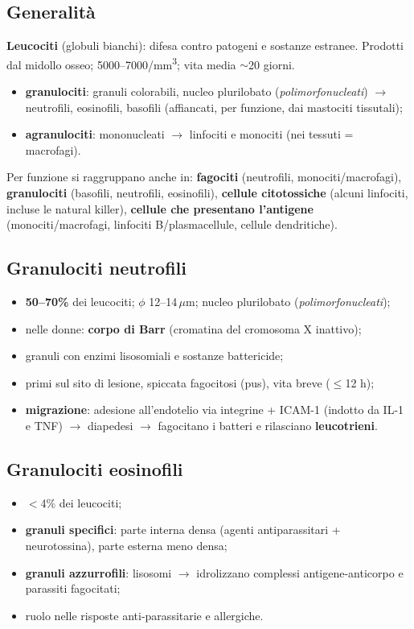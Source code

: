 \subsection{Generalità}
\textbf{Leucociti} (globuli bianchi): difesa contro patogeni e sostanze estranee. Prodotti dal
midollo osseo; 5000--7000/mm\textsuperscript{3}; vita media $\sim$20 giorni.
\begin{itemize}
  \item \textbf{granulociti}: granuli colorabili, nucleo plurilobato (\textit{polimorfonucleati})
    $\rightarrow$ neutrofili, eosinofili, basofili (affiancati, per funzione, dai mastociti
    tissutali);
  \item \textbf{agranulociti}: mononucleati $\rightarrow$ linfociti e monociti (nei tessuti =
    macrofagi).
\end{itemize}
Per funzione si raggruppano anche in: \textbf{fagociti} (neutrofili, monociti/macrofagi),
\textbf{granulociti} (basofili, neutrofili, eosinofili), \textbf{cellule citotossiche} (alcuni
linfociti, incluse le natural killer), \textbf{cellule che presentano l'antigene}
(monociti/macrofagi, linfociti B/plasmacellule, cellule dendritiche).

\subsection{Granulociti neutrofili}
\begin{itemize}
  \item \textbf{50--70\%} dei leucociti; $\phi$ 12--14\,$\mu$m; nucleo plurilobato
    (\textit{polimorfonucleati});
  \item nelle donne: \textbf{corpo di Barr} (cromatina del cromosoma X inattivo);
  \item granuli con enzimi lisosomiali e sostanze battericide;
  \item primi sul sito di lesione, spiccata fagocitosi (pus), vita breve ($\le$12 h);
  \item \textbf{migrazione}: adesione all'endotelio via integrine + ICAM-1 (indotto da IL-1 e TNF)
    $\rightarrow$ diapedesi $\rightarrow$ fagocitano i batteri e rilasciano \textbf{leucotrieni}.
\end{itemize}

\subsection{Granulociti eosinofili}
\begin{itemize}
  \item $<$4\% dei leucociti;
  \item \textbf{granuli specifici}: parte interna densa (agenti antiparassitari + neurotossina),
    parte esterna meno densa;
  \item \textbf{granuli azzurrofili}: lisosomi $\rightarrow$ idrolizzano complessi antigene-anticorpo
    e parassiti fagocitati;
  \item ruolo nelle risposte anti-parassitarie e allergiche.
\end{itemize}

